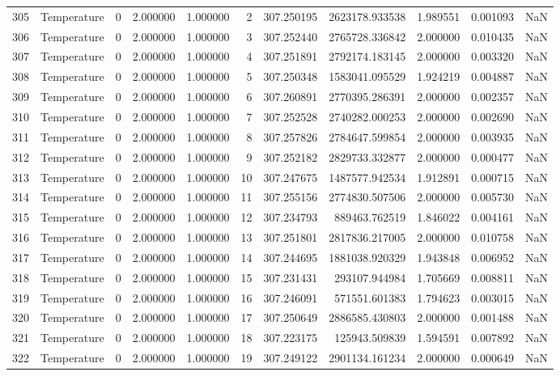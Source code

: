 \begin{tabular}{llrrrrrrrrr}
305 & Temperature & 0 & 2.000000 & 1.000000 & 2 & 307.250195 & 2623178.933538 & 1.989551 & 0.001093 & NaN \\
306 & Temperature & 0 & 2.000000 & 1.000000 & 3 & 307.252440 & 2765728.336842 & 2.000000 & 0.010435 & NaN \\
307 & Temperature & 0 & 2.000000 & 1.000000 & 4 & 307.251891 & 2792174.183145 & 2.000000 & 0.003320 & NaN \\
308 & Temperature & 0 & 2.000000 & 1.000000 & 5 & 307.250348 & 1583041.095529 & 1.924219 & 0.004887 & NaN \\
309 & Temperature & 0 & 2.000000 & 1.000000 & 6 & 307.260891 & 2770395.286391 & 2.000000 & 0.002357 & NaN \\
310 & Temperature & 0 & 2.000000 & 1.000000 & 7 & 307.252528 & 2740282.000253 & 2.000000 & 0.002690 & NaN \\
311 & Temperature & 0 & 2.000000 & 1.000000 & 8 & 307.257826 & 2784647.599854 & 2.000000 & 0.003935 & NaN \\
312 & Temperature & 0 & 2.000000 & 1.000000 & 9 & 307.252182 & 2829733.332877 & 2.000000 & 0.000477 & NaN \\
313 & Temperature & 0 & 2.000000 & 1.000000 & 10 & 307.247675 & 1487577.942534 & 1.912891 & 0.000715 & NaN \\
314 & Temperature & 0 & 2.000000 & 1.000000 & 11 & 307.255156 & 2774830.507506 & 2.000000 & 0.005730 & NaN \\
315 & Temperature & 0 & 2.000000 & 1.000000 & 12 & 307.234793 & 889463.762519 & 1.846022 & 0.004161 & NaN \\
316 & Temperature & 0 & 2.000000 & 1.000000 & 13 & 307.251801 & 2817836.217005 & 2.000000 & 0.010758 & NaN \\
317 & Temperature & 0 & 2.000000 & 1.000000 & 14 & 307.244695 & 1881038.920329 & 1.943848 & 0.006952 & NaN \\
318 & Temperature & 0 & 2.000000 & 1.000000 & 15 & 307.231431 & 293107.944984 & 1.705669 & 0.008811 & NaN \\
319 & Temperature & 0 & 2.000000 & 1.000000 & 16 & 307.246091 & 571551.601383 & 1.794623 & 0.003015 & NaN \\
320 & Temperature & 0 & 2.000000 & 1.000000 & 17 & 307.250649 & 2886585.430803 & 2.000000 & 0.001488 & NaN \\
321 & Temperature & 0 & 2.000000 & 1.000000 & 18 & 307.223175 & 125943.509839 & 1.594591 & 0.007892 & NaN \\
322 & Temperature & 0 & 2.000000 & 1.000000 & 19 & 307.249122 & 2901134.161234 & 2.000000 & 0.000649 & NaN \\

\end{tabular}
